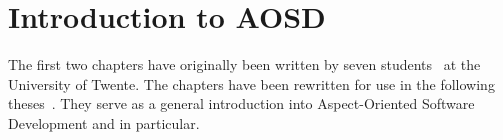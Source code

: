 \chapter{Introduction to AOSD}
\label{chp:AOSD}

The first two chapters have originally been written by seven \MSc students~\cite{Holljen2004,Durr2004,Vinkes2004,Bosman2004,Staijen2005,Havinga2005,Boschman2006} at the University of Twente.
The chapters have been rewritten for use in the following theses~\cite{VanOudheusden2006,Conradi2006,TeWinkel2006,Huttenhuis2006,Doornenbal2006,Huisman2006,SpenkelinkD2006}.
They serve as a general introduction into Aspect-Oriented Software Development and \Compose* in particular.



